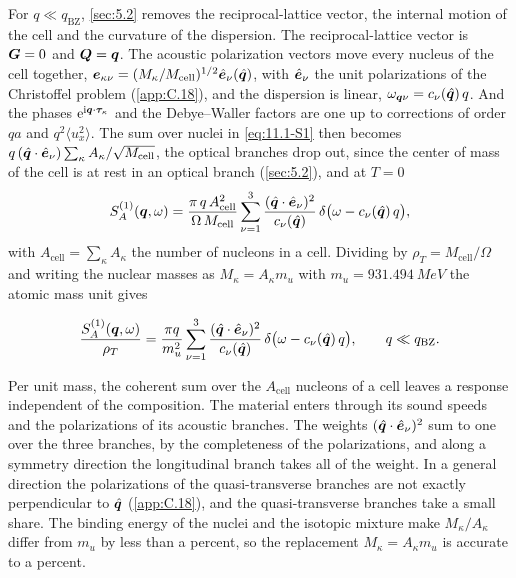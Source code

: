For $q \ll q_{\mathrm{BZ}}$, \cref{sec:5.2} removes the reciprocal-lattice vector, the internal motion of the cell and the curvature of the dispersion. The reciprocal-lattice vector is $\bm{G} = 0$ and $\bm{Q} = \bm{q}$. The acoustic polarization vectors move every nucleus of the cell together, $\bm{e}_{\kappa\nu} = (M_\kappa/M_{\mathrm{cell}})^{1/2}\hat{\bm{e}}_\nu(\hat{\bm{q}})$, with $\hat{\bm{e}}_\nu$ the unit polarizations of the Christoffel problem (\cref{app:C.18}), and the dispersion is linear, $\omega_{\bm{q}\nu} = c_\nu(\hat{\bm{q}})\,q$. And the phases $\mathrm{e}^{\mathrm{i}\bm{q}\cdot\bm{\tau}_\kappa}$ and the Debye--Waller factors are one up to corrections of order $qa$ and $q^2\langle u_x^2\rangle$. The sum over nuclei in \cref{eq:11.1-S1} then becomes $q\,(\hat{\bm{q}}\cdot\hat{\bm{e}}_\nu)\sum_\kappa A_\kappa/\sqrt{M_{\mathrm{cell}}}$, the optical branches drop out, since the center of mass of the cell is at rest in an optical branch (\cref{sec:5.2}), and at $T = 0$
\begin{equation*}
  S^{(1)}_A(\bm{q},\omega) = \frac{\pi\,q\,A_{\mathrm{cell}}^2}{\Omega\,M_{\mathrm{cell}}}\sum_{\nu = 1}^{3}\frac{(\hat{\bm{q}}\cdot\hat{\bm{e}}_\nu)^2}{c_\nu(\hat{\bm{q}})}\,\delta\bigl(\omega - c_\nu(\hat{\bm{q}})\,q\bigr) ,
\end{equation*}
with $A_{\mathrm{cell}} = \sum_\kappa A_\kappa$ the number of nucleons in a cell. Dividing by $\rho_T = M_{\mathrm{cell}}/\Omega$ and writing the nuclear masses as $M_\kappa = A_\kappa m_u$ with $m_u = \SI{931.494}{MeV}$ the atomic mass unit gives
\begin{keyresult}
\begin{equation}
  \frac{S^{(1)}_A(\bm{q},\omega)}{\rho_T} = \frac{\pi q}{m_u^2}\sum_{\nu = 1}^{3}\frac{(\hat{\bm{q}}\cdot\hat{\bm{e}}_\nu)^2}{c_\nu(\hat{\bm{q}})}\,\delta\bigl(\omega - c_\nu(\hat{\bm{q}})\,q\bigr) , \qquad q \ll q_{\mathrm{BZ}} .
  \label{eq:11.1-Sac}
\end{equation}
\end{keyresult}
\noindent Per unit mass, the coherent sum over the $A_{\mathrm{cell}}$ nucleons of a cell leaves a response independent of the composition. The material enters through its sound speeds and the polarizations of its acoustic branches. The weights $(\hat{\bm{q}}\cdot\hat{\bm{e}}_\nu)^2$ sum to one over the three branches, by the completeness of the polarizations, and along a symmetry direction the longitudinal branch takes all of the weight. In a general direction the polarizations of the quasi-transverse branches are not exactly perpendicular to $\hat{\bm{q}}$ (\cref{app:C.18}), and the quasi-transverse branches take a small share. The binding energy of the nuclei and the isotopic mixture make $M_\kappa/A_\kappa$ differ from $m_u$ by less than a percent, so the replacement $M_\kappa = A_\kappa m_u$ is accurate to a percent.

